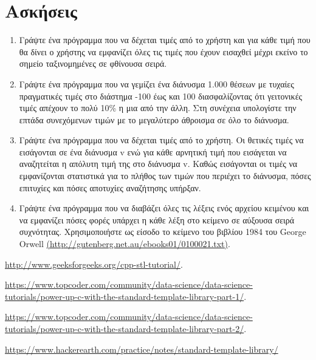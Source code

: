 



\section{Ασκήσεις}
\begin{enumerate}[nolistsep]
\item Γράψτε ένα πρόγραμμα που να δέχεται τιμές από το χρήστη και για κάθε τιμή που θα δίνει ο χρήστης να εμφανίζει όλες τις τιμές που έχουν εισαχθεί μέχρι εκείνο το σημείο ταξινομημένες σε φθίνουσα σειρά. 
\item Γράψτε ένα πρόγραμμα που να γεμίζει ένα διάνυσμα 1.000 θέσεων με τυχαίες πραγματικές τιμές στο διάστημα -100 έως και 100 διασφαλίζοντας ότι γειτονικές τιμές απέχουν το πολύ 10\% η μια από την άλλη. Στη συνέχεια υπολογίστε την επτάδα συνεχόμενων τιμών με το μεγαλύτερο άθροισμα σε όλο το διάνυσμα.
\item Γράψτε ένα πρόγραμμα που να δέχεται τιμές από το χρήστη. Οι θετικές τιμές να εισάγονται σε ένα διάνυσμα v ενώ για κάθε αρνητική τιμή που εισάγεται να αναζητείται η απόλυτη τιμή της στο διάνυσμα v. Καθώς εισάγονται οι τιμές να εμφανίζονται στατιστικά για το πλήθος των τιμών που περιέχει το διάνυσμα, πόσες επιτυχίες και πόσες αποτυχίες αναζήτησης υπήρξαν.
\item Γράψτε ένα πρόγραμμα που να διαβάζει όλες τις λέξεις ενός αρχείου κειμένου και να εμφανίζει πόσες φορές υπάρχει η κάθε λέξη στο κείμενο σε αύξουσα σειρά συχνότητας. Χρησιμοποιήστε ως είσοδο το κείμενο του βιβλίου 1984 του George Orwell \href{http://gutenberg.net.au/ebooks01/0100021.txt}{(http://gutenberg.net.au/ebooks01/0100021.txt)}.
\end{enumerate}

\begin{thebibliography}{9}

\href{http://www.geeksforgeeks.org/cpp-stl-tutorial/}{http://www.geeksforgeeks.org/cpp-stl-tutorial/}.

\href{https://www.topcoder.com/community/data-science/data-science-tutorials/power-up-c-with-the-standard-template-library-part-1/}{https://www.topcoder.com/community/data-science/data-science-tutorials/power-up-c-with-the-standard-template-library-part-1/}.

\href{https://www.topcoder.com/community/data-science/data-science-tutorials/power-up-c-with-the-standard-template-library-part-1/}{https://www.topcoder.com/community/data-science/data-science-tutorials/power-up-c-with-the-standard-template-library-part-2/}.

\href{https://www.hackerearth.com/practice/notes/standard-template-library/}{https://www.hackerearth.com/practice/notes/standard-template-library/}

\end{thebibliography}

